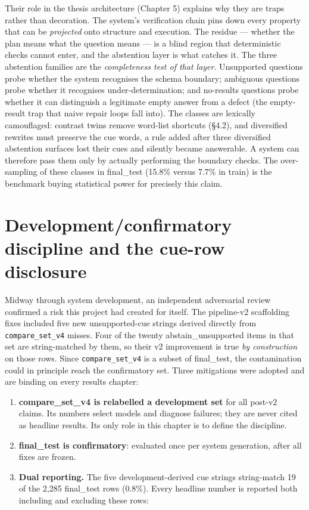 Their role in the thesis architecture (Chapter 5) explains why they are traps rather than decoration. The system's verification chain pins down every property that can be \emph{projected} onto structure and execution. The residue --- whether the plan means what the question means --- is a blind region that deterministic checks cannot enter, and the abstention layer is what catches it. The three abstention families are the \emph{completeness test of that layer}. Unsupported questions probe whether the system recognises the schema boundary; ambiguous questions probe whether it recognises under-determination; and no-results questions probe whether it can distinguish a legitimate empty answer from a defect (the empty-result trap that naive repair loops fall into). The classes are lexically camouflaged: contrast twins remove word-list shortcuts (§4.2), and diversified rewrites must preserve the cue words, a rule added after three diversified abstention surfaces lost their cues and silently became answerable. A system can therefore pass them only by actually performing the boundary checks. The over-sampling of these classes in final\_test (15.8\% versus 7.7\% in train) is the benchmark buying statistical power for precisely this claim.

\section{Development/confirmatory discipline and the cue-row disclosure}\label{sec:development-confirmatory-discipline-and}

Midway through system development, an independent adversarial review confirmed a risk this project had created for itself. The pipeline-v2 scaffolding fixes included five new unsupported-cue strings derived directly from \texttt{compare\_set\_v4} misses. Four of the twenty abstain\_unsupported items in that set are string-matched by them, so their v2 improvement is true \emph{by construction} on those rows. Since \texttt{compare\_set\_v4} is a subset of final\_test, the contamination could in principle reach the confirmatory set. Three mitigations were adopted and are binding on every results chapter:

\begin{enumerate}
\item \textbf{compare\_set\_v4 is relabelled a development set} for all post-v2 claims. Its numbers select models and diagnose failures; they are never cited as headline results. Its only role in this chapter is to define the discipline.
\item \textbf{final\_test is confirmatory}: evaluated once per system generation, after all fixes are frozen.
\item \textbf{Dual reporting.} The five development-derived cue strings string-match 19 of the 2,285 final\_test rows (0.8\%). Every headline number is reported both including and excluding these rows:
\end{enumerate}

